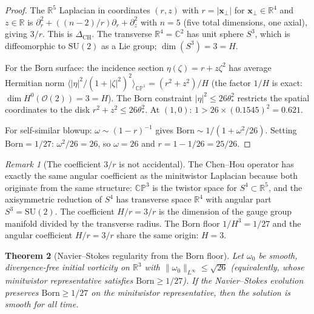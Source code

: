 \documentclass[11pt,a4paper]{article}
\newtheorem{theorem}{Theorem}[section]
\theoremstyle{definition}
\theoremstyle{remark}
\newtheorem{remark}[theorem]{Remark}
\newcommand{\CP}{\mathbb{CP}}
\newcommand{\C}{\mathbb{C}}
\newcommand{\R}{\mathbb{R}}
\newcommand{\SU}{\mathrm{SU}}
\begin{document}
\begin{proof}
The $\R^5$ Laplacian in coordinates $(r,z)$ with $r=|\mathbf{x}_\perp|$ for $\mathbf{x}_\perp\in\R^4$ and $z\in\R$ is $\partial_r^2+((n-2)/r)\partial_r+\partial_z^2$ with $n=5$ (five total dimensions, one axial), giving $3/r$. This is $\Delta_{\mathrm{CH}}$. The transverse $\R^4=\C^2$ has unit sphere $S^3$, which is diffeomorphic to $\SU(2)$ as a Lie group; $\dim(S^3)=3=H$.

For the Born surface: the incidence section $\eta(\zeta)=r+z\zeta^2$ has average Hermitian norm $\langle|\eta|^2/(1+|\zeta|^2)^2\rangle_{\CP^1}=(r^2+z^2)/H$ (the factor $1/H$ is exact: $\dim H^0(\mathcal{O}(2))=3=H$). The Born constraint $|\eta|^2\leq 26\theta_*^2$ restricts the spatial coordinates to the disk $r^2+z^2\leq 26\theta_*^2$. At $(1,0)$: $1>26\times(0.1545)^2=0.621$.

For self-similar blowup: $\omega\sim(1-r)^{-1}$ gives $\mathrm{Born}\sim 1/(1+\omega^2/26)$. Setting $\mathrm{Born}=1/27$: $\omega^2/26=26$, so $\omega=26$ and $r=1-1/26=25/26$.
\end{proof}

\begin{remark}[The coefficient $3/r$ is not accidental]
The Chen--Hou operator has exactly the same angular coefficient as the minitwistor Laplacian because both originate from the same structure: $\CP^3$ is the twistor space for $S^4\subset\R^5$, and the axisymmetric reduction of $S^4$ has transverse space $\R^4$ with angular part $S^3=\SU(2)$. The coefficient $H/r=3/r$ is the dimension of the gauge group manifold divided by the transverse radius. The Born floor $1/H^3=1/27$ and the angular coefficient $H/r=3/r$ share the same origin: $H=3$.
\end{remark}

\begin{theorem}[Navier--Stokes regularity from the Born floor]\label{thm:ns_regularity}
Let $\omega_0$ be smooth, divergence-free initial vorticity on $\R^3$ with $\|\omega_0\|_{L^\infty}\leq\sqrt{26}$ (equivalently, whose minitwistor representative satisfies $\mathrm{Born}\geq 1/27$). If the Navier--Stokes evolution preserves $\mathrm{Born}\geq 1/27$ on the minitwistor representative, then the solution is smooth for all time.
\end{theorem}
\end{document}
